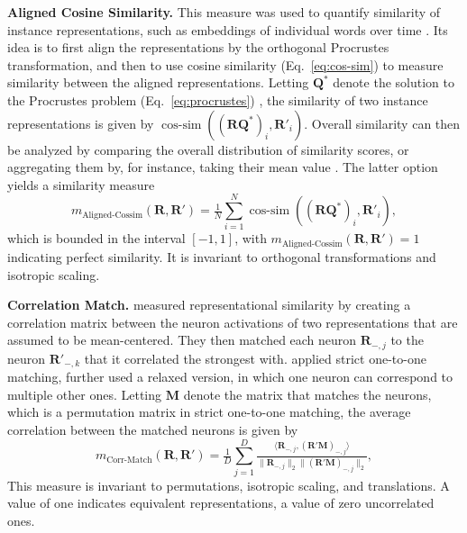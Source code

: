 \documentclass{article}
\newcommand{\citet}{\textcite}
\newcommand{\R}{\bm{R}}
\newcommand{\Rp}{\bm{R'}}
\newcommand\myeqref[1]{%
    (\textup{Eq.~\ref{#1}})%
}
\newcommand{\subheader}{\textbf}
\begin{document}
\subheader{Aligned Cosine Similarity.}
This measure was used to quantify similarity of instance representations, such as embeddings of individual words over time \cite{hamilton_diachronic_2018}.
Its idea is to first align the representations by the orthogonal Procrustes transformation, and then to use cosine similarity \myeqref{eq:cos-sim} to measure similarity between the aligned representations.
Letting $\bm{Q}^*$ denote the solution to the Procrustes problem \myeqref{eq:procrustes}, the similarity of two instance representations is given by
$\operatorname{cos-sim}\left((\R \bm{Q}^*)_i, \Rp_i\right).$
Overall similarity can then be analyzed by comparing the overall distribution of similarity scores, or aggregating them by, for instance, taking their mean value \cite{schumacher_effects_2021}.
The latter option yields a similarity measure
\begin{equation}\label{eq:aligned_cossim}
    m_{\operatorname{Aligned-Cossim}}(\R, \Rp) = \tfrac{1}{N}\textstyle\sum_{i=1}^N \operatorname{cos-sim}\left((\R \bm{Q}^*)_i, \Rp_i\right),
\end{equation}
which is bounded in the interval $[-1,1]$, with $m_{\operatorname{Aligned-Cossim}}(\R, \Rp) = 1$ indicating perfect similarity.
It is invariant to orthogonal transformations and isotropic scaling.


\subheader{Correlation Match.}
\citet{li_convergent_2016} measured representational similarity by creating a correlation matrix between the neuron activations of two representations that are assumed to be mean-centered.
They then matched each neuron $\R_{-,j}$ to the neuron $\Rp_{-,k}$ that it correlated the strongest with.
\citet{wu_similarity_2020} applied strict one-to-one matching, \citet{li_convergent_2016} further used a relaxed version, in which one neuron can correspond to multiple other ones.
Letting $\bm{M}$ denote the matrix that matches the neurons, which is a permutation matrix in strict one-to-one matching,
the average correlation between the matched neurons is given by
\begin{equation}\label{eq:corr_match}
    m_{\text{Corr-Match}}(\R, \Rp) = \tfrac{1}{D}\textstyle\sum_{j=1}^D \tfrac{\langle \R_{-,j}, (\Rp \bm{M})_{-,j} \rangle}{\|\R_{-,j}\|_2 \|(\Rp \bm{M})_{-,j}\|_2},
\end{equation}
This measure is invariant to permutations, isotropic scaling, and translations.
A value of one indicates equivalent representations, a value of zero uncorrelated ones.
\end{document}
